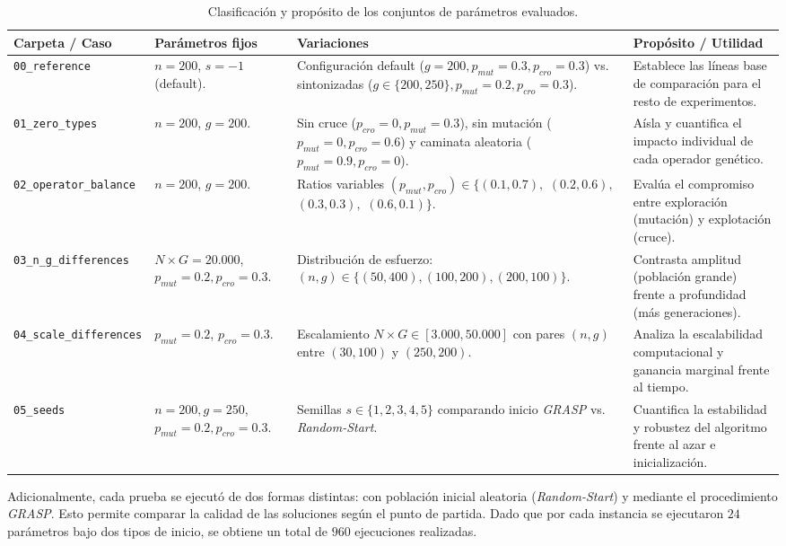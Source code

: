\begin{table}[htbp]
\centering
\footnotesize
\setlength{\tabcolsep}{3.5pt}
\caption{Clasificación y propósito de los conjuntos de parámetros evaluados.}
\label{tab:carpetas_parametros}
\begin{tabular}{>{\raggedright\arraybackslash}p{2.4cm} >{\raggedright\arraybackslash}p{2.6cm} >{\raggedright\arraybackslash}p{4.4cm} >{\raggedright\arraybackslash}p{4.0cm}}
\toprule
\textbf{Carpeta / Caso} & \textbf{Parámetros fijos} & \textbf{Variaciones} & \textbf{Propósito / Utilidad} \\
\midrule
\texttt{00\_reference} & $n = 200$, $s = -1$ (default). & Configuración default ($g=200, p_{mut}=0.3, p_{cro}=0.3$) vs. sintonizadas ($g \in \{200, 250\}, p_{mut}=0.2, p_{cro}=0.3$). & Establece las líneas base de comparación para el resto de experimentos. \\
\addlinespace[2pt]
\texttt{01\_zero\_types} & $n = 200$, $g = 200$. & Sin cruce ($p_{cro}=0, p_{mut}=0.3$), sin mutación ($p_{mut}=0, p_{cro}=0.6$) y caminata aleatoria ($p_{mut}=0.9, p_{cro}=0$). & Aísla y cuantifica el impacto individual de cada operador genético. \\
\addlinespace[2pt]
\texttt{02\_operator\_}\linebreak[0]\texttt{balance} & $n = 200$, $g = 200$. & Ratios variables $(p_{mut}, p_{cro}) \in \{(0.1, 0.7),$ $(0.2, 0.6),$ $(0.3, 0.3),$ $(0.6, 0.1)\}$. & Evalúa el compromiso entre exploración (mutación) y explotación (cruce). \\
\addlinespace[2pt]
\texttt{03\_n\_g\_}\linebreak[0]\texttt{differences} & $N \times G = 20.000$, $p_{mut}=0.2, p_{cro}=0.3$. & Distribución de esfuerzo: $(n, g) \in \{(50, 400), (100, 200), (200, 100)\}$. & Contrasta amplitud (población grande) frente a profundidad (más generaciones). \\
\addlinespace[2pt]
\texttt{04\_scale\_}\linebreak[0]\texttt{differences} & $p_{mut} = 0.2$, $p_{cro} = 0.3$. & Escalamiento $N \times G \in [3.000, 50.000]$ con pares $(n, g)$ entre $(30, 100)$ y $(250, 200)$. & Analiza la escalabilidad computacional y ganancia marginal frente al tiempo. \\
\addlinespace[2pt]
\texttt{05\_seeds} & $n = 200, g = 250$, $p_{mut} = 0.2, p_{cro} = 0.3$. & Semillas $s \in \{1, 2, 3, 4, 5\}$ comparando inicio \textit{GRASP} vs. \textit{Random-Start}. & Cuantifica la estabilidad y robustez del algoritmo frente al azar e inicialización. \\
\bottomrule
\end{tabular}
\end{table}

Adicionalmente, cada prueba se ejecutó de dos formas distintas: con población inicial aleatoria (\textit{Random-Start}) y mediante el procedimiento \textit{GRASP}. Esto permite comparar la calidad de las soluciones según el punto de partida. Dado que por cada instancia se ejecutaron $24$ parámetros bajo dos tipos de inicio, se obtiene un total de $960$ ejecuciones realizadas.
